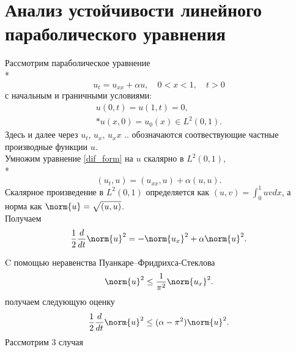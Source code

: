 \section{Анализ устойчивости линейного параболического уравнения}
Рассмотрим параболическое уравнение \\*
\begin{equation}\label{dif_form}
u_t = u_{xx} + \alpha u, \quad 0 < x < 1, \quad t > 0
\end{equation}
с начальным и граничными условиями:
\begin{gather}\label{d_control}
u(0, t) = u(1, t) = 0, \\*
u(x, 0) = u_{0}(x) \in L^2(0, 1). \nonumber
\end{gather}
Здесь и далее через $u_t$, $u_x$, $u_xx$ .. обозначаются соотвествующие частные производные функции $u$.\\
Умножим уравнение \eqref{dif_form} на $u$ скалярно в $L^2(0, 1)$,\\*
\begin{equation*}
(u_t, u) = (u_{xx}, u) + \alpha (u, u).
\end{equation*}
Скалярное произведение в $L^2(0, 1)$ определяется как $(u, v) = \int_0^1 uv dx$, а норма как $\norm{u} = \sqrt{(u, u)}$.\\
Получаем 
\begin{equation}\label{int_form}
\frac{1}{2}\frac{d}{dt}\norm{u}^2 = -\norm{u_x}^2 + \alpha \norm{u}^2.
\end{equation}


C помощью неравенства Пуанкаре–Фридрихса-Стеклова
\begin{equation*}
\norm{u}^2 \le \frac{1}{\pi^2} \norm{u_x}^2.
\end{equation*}
получаем следующую оценку 
\begin{equation}\label{stable_opr}
\frac{1}{2}\frac{d}{dt}\norm{u}^2 \le (\alpha - \pi^2)\norm{u}^2.
\end{equation}
Рассмотрим 3 случая

